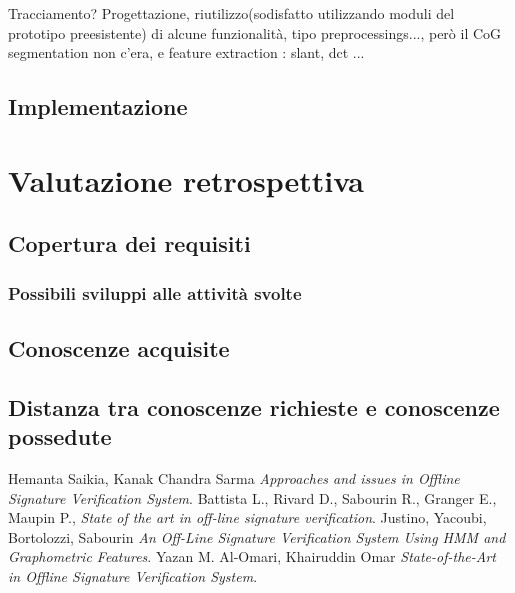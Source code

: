 Tracciamento? Progettazione, riutilizzo(sodisfatto utilizzando moduli del prototipo preesistente) di alcune funzionalità, tipo preprocessings..., però il CoG segmentation non c'era, e feature extraction : slant, dct ...

\subsection{Implementazione}
\label{3.4}
\newpage

\section{Valutazione retrospettiva}
\label{4.0}

\subsection{Copertura dei requisiti}
\label{4.1}

\subsubsection{Possibili sviluppi alle attività svolte}
\subsection{Conoscenze acquisite}

\label{4.2}
\subsection{Distanza tra conoscenze richieste e conoscenze possedute}

\label{4.3}
\newpage

\printglossaries
{}
\label{5.0}

\newpage
\begin{thebibliography}{1}
 Hemanta Saikia, Kanak Chandra Sarma {\em Approaches and issues in Offline Signature Verification System}.
 Battista L., Rivard D., Sabourin R., Granger E., Maupin P., {\em State of the art in off-line signature verification}.
 Justino, Yacoubi, Bortolozzi, Sabourin {\em An Off-Line Signature Verification System Using HMM and Graphometric Features}.
 Yazan M. Al-Omari, Khairuddin Omar {\em State-of-the-Art in Offline Signature Verification System}.
\end{thebibliography}
\label{6.0}

\newpage





